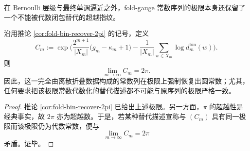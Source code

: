 在 Bernoulli 层级与最终单调逼近之外，fold-gauge 常数序列的极限本身还保留了一个不能被代数闭包替代的超越指纹。

\begin{proposition}[圆常数的折叠恢复]\label{prop:xi-time-part59-foldgauge-circle-constant-recovery}
沿用推论 \ref{cor:fold-bin-recover-2pi} 的记号，定义
\[
C_m
:=
\exp\!\Biggl(
\frac{2^{m+1}}{|X_m|}\bigl(g_m-\kappa_m+1\bigr)
-\frac{1}{|X_m|}\sum_{w\in X_m}\log d_m^{\mathrm{bin}}(w)
\Biggr).
\]
则
\[
\lim_{m\to\infty}C_m=2\pi.
\]
因此，这一完全由离散折叠数据构成的常数列在极限上强制恢复出圆常数；尤其，任何要求把该极限常数代数化的替代描述都不可能与原序列的极限严格一致。
\end{proposition}
\begin{proof}
推论 \ref{cor:fold-bin-recover-2pi} 已给出上述极限。另一方面，\(\pi\) 的超越性是经典事实，故 \(2\pi\) 亦为超越数。于是，若某种替代描述宣称与 \((C_m)\) 具有同一极限而该极限仍为代数常数，便与
\[
\lim_{m\to\infty}C_m=2\pi
\]
矛盾。证毕。
\end{proof}

\endinput
